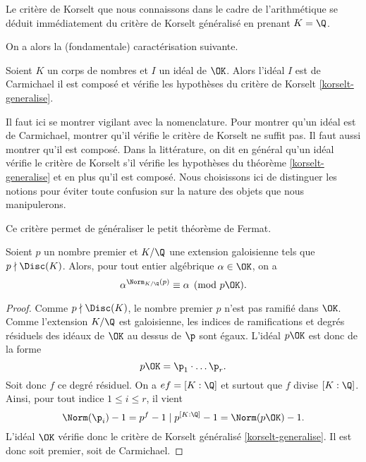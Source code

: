 \begin{remarque}
	Le critère de Korselt que nous connaissons dans le cadre de l'arithmétique se déduit immédiatement du critère de Korselt généralisé en prenant $K=\Q$.
\end{remarque}

On a alors la (fondamentale) caractérisation suivante.

\begin{corollaire}\label{carac-korselt}
	Soient $K$ un corps de nombres et $I$ un idéal de $\OK$. Alors l'idéal $I$ est de Carmichael \ssi il est composé et vérifie les hypothèses du critère de Korselt \ref{korselt-generalise}.
\end{corollaire}

\begin{remarque}
	Il faut ici se montrer vigilant avec la nomenclature. Pour montrer qu'un idéal est de Carmichael, montrer qu'il vérifie le critère de Korselt ne suffit pas. Il faut aussi montrer qu'il est composé. Dans la littérature, on dit en général qu'un idéal vérifie le critère de Korselt s'il vérifie les hypothèses du théorème \ref{korselt-generalise} et en plus qu'il est composé. Nous choisissons ici de distinguer les notions pour éviter toute confusion sur la nature des objets que nous manipulerons.
\end{remarque}

Ce critère permet de généraliser le petit théorème de Fermat.

\begin{theoreme}\label{ptf}
	Soient $p$ un nombre premier et $K/\Q$ une extension galoisienne tels que $p\nmid \Disc(K)$. Alors, pour tout entier algébrique $\alpha \in \OK$, on a $$\alpha^{\Norm_{K/\Q}(p)} \equiv \alpha \pmod{p\OK}.$$
\end{theoreme}

\begin{proof}
	Comme $p\nmid \Disc(K)$, le nombre premier $p$ n'est pas ramifié dans $\OK$. Comme l'extension $K/\Q$ est galoisienne, les indices de ramifications et degrés résiduels des idéaux de $\OK$ au dessus de $\p$ sont égaux. L'idéal $p\OK$ est donc de la forme \[p\OK = \p_1\cdot \dots \p_r.\] Soit donc $f$ ce degré résiduel. On a $ef = [K : \Q]$ et surtout que $f$ divise $[ K : \Q ]$. Ainsi, pour tout indice $1\leq i \leq r$, il vient \[ \Norm(\p_i) - 1 = p^f - 1 \mid p^{[K : \Q]} - 1 = \Norm(p\OK) - 1.\] L'idéal $\OK$ vérifie donc le critère de Korselt généralisé \ref{korselt-generalise}. Il est donc soit premier, soit de Carmichael.
\end{proof}

